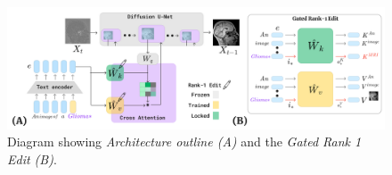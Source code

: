 \begin{figure}[H]
\centering
\includegraphics[width=\columnwidth]{main/content/images/diagrams/perfusion.png}
\caption{Diagram showing \textit{Architecture outline (A)} and the \textit{Gated Rank 1 Edit (B)}.}
\label{fig:perfusion}
\end{figure}